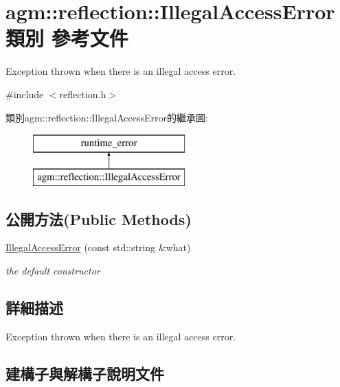 \hypertarget{classagm_1_1reflection_1_1_illegal_access_error}{}\section{agm\+:\+:reflection\+:\+:Illegal\+Access\+Error 類別 參考文件}
\label{classagm_1_1reflection_1_1_illegal_access_error}


Exception thrown when there is an illegal access error.  




{\ttfamily \#include $<$reflection.\+h$>$}

類別agm\+:\+:reflection\+:\+:Illegal\+Access\+Error的繼承圖\+:\begin{figure}[H]
\begin{center}
\leavevmode
\includegraphics[height=2.000000cm]{classagm_1_1reflection_1_1_illegal_access_error}
\end{center}
\end{figure}
\subsection*{公開方法(Public Methods)}
\begin{DoxyCompactItemize}
\item 
\hyperlink{classagm_1_1reflection_1_1_illegal_access_error_ae97eef56c68951893ff314709e5f0cd8}{Illegal\+Access\+Error} (const std\+::string \&what)
\begin{DoxyCompactList}\small\item\em the default constructor \end{DoxyCompactList}\end{DoxyCompactItemize}


\subsection{詳細描述}
Exception thrown when there is an illegal access error. 

\subsection{建構子與解構子說明文件}
